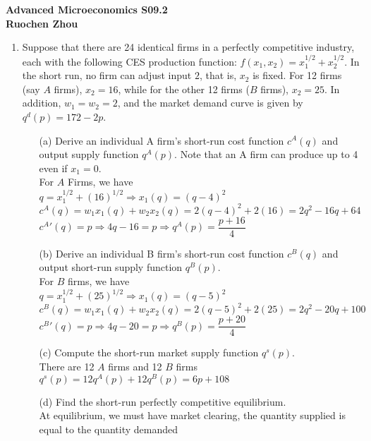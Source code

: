 \documentclass[11pt]{article}
\begin{document}
\begin{center}
\textbf{Advanced Microeconomics S09.2\\}
\textbf{Ruochen Zhou}
\end{center}

\begin{enumerate}
\item Suppose that there are 24 identical firms in a perfectly competitive industry, each with the following CES production function: $f(x_{1},x_{2})=x_{1}^{1/2}+x_{2}^{1/2}$. In the short run, no firm can adjust input $2$, that is, $x_{2}$ is fixed. For 12 firms (say $A$ firms), $x_{2}=16$, while for the other 12 firms ($B$ firms), $x_{2}=25$. In addition, $w_{1}=w_{2}=2$, and the market demand curve is given by $q^{d}(p)=172-2p$.
	\begin{itemize}
	\item[(a)] Derive an individual A firm's short-run cost function $c^{A}(q)$ and output supply function $q^{A}(p)$. Note that an A firm can produce up to 4 even if $x_{1}=0$.
	\medskip\\
	For $A$ Firms, we have\\
	$q=x_1^{1/2}+(16)^{1/2}\Rightarrow x_1(q)=(q-4)^2$\\
	$c^A(q)=w_1x_1(q)+w_2x_2(q)=2(q-4)^2+2(16)=2q^2-16q+64$\\
	$c^A'(q)=p\Rightarrow4q-16=p\Rightarrow q^A(p)=\dfrac{p+16}{4}$\\
	\item[(b)] Derive an individual B firm's short-run cost function $c^{B}(q)$ and output short-run supply function $q^{B}(p)$.
	\medskip\\
	For $B$ firms, we have\\
	$q=x_1^{1/2}+(25)^{1/2}\Rightarrow x_1(q)=(q-5)^2$\\
	$c^B(q)=w_1x_1(q)+w_2x_2(q)=2(q-5)^2+2(25)=2q^2-20q+100$\\
	$c^B'(q)=p\Rightarrow4q-20=p\Rightarrow q^B(p)=\dfrac{p+20}{4}$\\
	\item[(c)] Compute the short-run market supply function $q^{s}(p)$.
	\medskip\\
	There are 12 $A$ firms and 12 $B$ firms\\
	$q^s(p)=12q^A(p)+12q^B(p)=6p+108$\\
	\item[(d)] Find the short-run perfectly competitive equilibrium.
	\medskip\\
	At equilibrium, we must have market clearing, the quantity supplied is equal to the quantity demanded\\

\end{itemize}
\end{enumerate}
\end{document}
